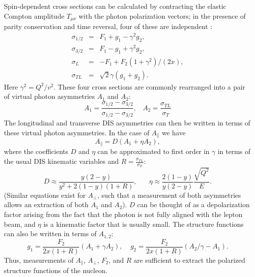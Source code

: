 Spin-dependent cross sections can be calculated by contracting the elastic Compton amplitude $T_{\mu \nu}$ with the photon polarization vectors; in the presence of parity conservation and time reversal, four of these are independent \cite{??}:
%
\begin{eqnarray}
  \sigma_{1/2} & = & F_1 + g_1 - \gamma^2 g_2, \nonumber \\
  \sigma_{3/2} & = & F_1 - g_1 + \gamma^2 g_2, \nonumber \\
  \sigma_L & = & -F_1 + F_2(1+\gamma^2)/(2x),  \nonumber \\
  \sigma_{TL} & = & \sqrt{2}\gamma (g_1+g_2).
\end{eqnarray}
%
Here $\gamma^2 = Q^2/v^2$.  These four cross sections are commonly rearranged into a pair of virtual photon asymmetries $A_1$ and $A_2$:
%
\begin{equation}
  A_1 = \frac{\sigma_{1/2} - \sigma_{3/2}}{\sigma_{1/2} - \sigma_{3/2}}, ~~~~ A_2 = \frac{\sigma_{TL}}{\sigma_T}
\end{equation}
%
The longitudinal and transverse DIS asymmetries can then be written in terms of these virtual photon asymmetries.  In the case of $A_{\parallel}$ we have
\begin{equation}
  A_{\parallel} = D(A_1 + \eta A_2),
\end{equation}
%
where the coefficients $D$ and $\eta$ can be approximated to first order in $\gamma$ in terms of the usual DIS kinematic variables and $R = \frac{\sigma_{TL}}{\sigma_T}$:
\begin{equation}
  D \approx \frac{y(2-y)}{y^2 + 2(1-y)(1+R)}, ~~~~~~~~ \eta \approx \frac{2(1-y)}{y(2-y)} \frac{\sqrt{Q^2}}{E}.
\end{equation}
%
(Similar equations exist for $A_{\perp}$, such that a measurement of both asymmetries allows an extraction of both $A_1$ and $A_2$). $D$ can be thought of as a depolarization factor arising from the fact that the photon is not fully aligned with the lepton beam, and $\eta$ is a kinematic factor that is usually small.  The structure functions can also be written in terms of $A_{1,2}$:
\begin{equation}
  g_1 = \frac{F_2}{2x(1+R)}(A_1+\gamma A_2), ~~~~~ g_2 = \frac{F_2}{2x(1+R)}(A_2/\gamma - A_1).
\end{equation}
Thus, measurements of $A_{\parallel}$, $A_{\perp}$, $F_2$, and $R$ are sufficient to extract the polarized structure functions of the nucleon.


